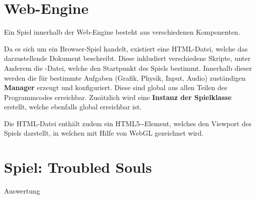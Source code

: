 \part{Web-Engine}

Ein Spiel innerhalb der Web-Engine besteht aus verschiedenen Komponenten.

Da es sich um ein Browser-Spiel handelt, existiert eine HTML-Datei, welche das darzustellende Dokument beschreibt. Diese inkludiert verschiedene Skripte, unter Anderem die -Datei, welche den Startpunkt des Spiels bestimmt. Innerhalb dieser werden die für bestimmte Aufgaben (Grafik, Physik, Input, Audio) zuständigen \textbf{Manager} erzeugt und konfiguriert. Diese sind global aus allen Teilen des Programmcodes erreichbar. Zusätzlich wird eine \textbf{Instanz der Spielklasse} erstellt, welche ebenfalls global erreichbar ist.

Die HTML-Datei enthält zudem ein HTML5--Element, welches den Viewport des Spiels darstellt, in welchen mit Hilfe von WebGL gezeichnet wird.













\part{Spiel: Troubled Souls}





Auswertung